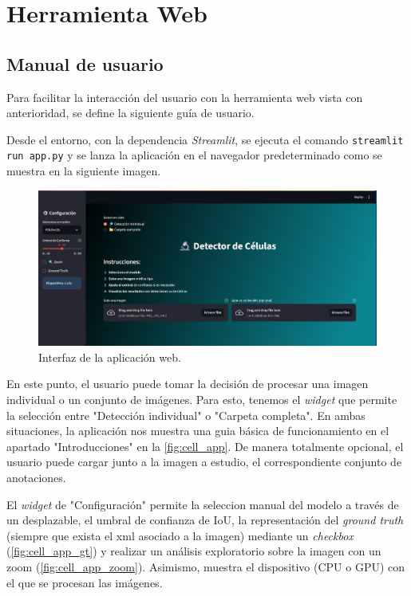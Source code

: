 \documentclass[12pt,a4paper,onecolumn,oneside]{report}
\begin{document}
\chapter{Herramienta Web} %
\label{Herramienta Web anexo}

\section{Manual de usuario}
\label{Manual de usuario}
Para facilitar la interacción del usuario con la herramienta web vista con anterioridad, se define la siguiente guía de usuario.

Desde el entorno, con la dependencia \textit{Streamlit}, se ejecuta el comando \texttt{streamlit run app.py} y se lanza la aplicación en el navegador predeterminado
como se muestra en la siguiente imagen.

\begin{figure}[htbp]
  \centering
  \includegraphics[width=1.0\textwidth]{figuras/app/cell_app.png}
  \caption{Interfaz de la aplicación web.}
  \label{fig:cell_app}
\end{figure}

En este punto, el usuario puede tomar la decisión de procesar una imagen individual o un conjunto de imágenes. Para esto, 
tenemos el \textit{widget} que permite la selección entre "Detección individual" o "Carpeta completa". En ambas situaciones,
la aplicación nos muestra una guia básica de funcionamiento en el apartado "Introducciones" en la \autoref{fig:cell_app}.
De manera totalmente opcional, el usuario puede cargar junto a la imagen a estudio, el correspondiente conjunto de anotaciones.

El \textit{widget} de "Configuración" permite la seleccion manual del modelo a través de un desplazable, el umbral de confianza de IoU, 
la representación del \textit{ground truth} (siempre que exista el xml asociado a la imagen) mediante un \textit{checkbox} (\autoref{fig:cell_app_gt}) y realizar un análisis exploratorio
sobre la imagen con un zoom (\autoref{fig:cell_app_zoom}). Asimismo, muestra el dispositivo (CPU o GPU) con el que se procesan las imágenes.
\end{document}
